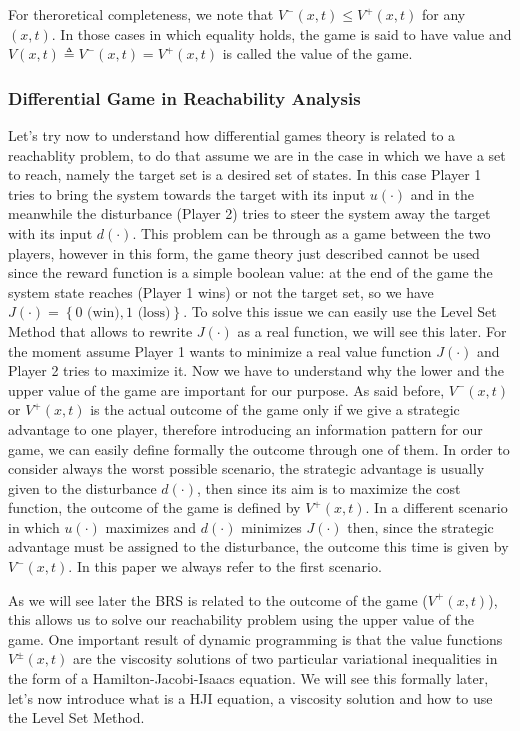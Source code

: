 For theroretical completeness, we note that $V^-(x,t) \leq V^+(x,t)$ for any $(x,t)$. In those cases in which equality holds, the game is said to have value and $V(x,t)\triangleq V^-(x,t) = V^+(x,t)$ is called the value of the game. \cite{new_paper} \newline

\subsubsection{Differential Game in Reachability Analysis}
Let's try now to understand how differential games theory is related to a reachablity problem, to do that assume we are in the case in which we have a set to reach, namely the target set is a desired set of states. In this case Player 1 tries to bring the system towards the target with its input $u(\cdot)$ and in the meanwhile the disturbance (Player 2) tries to steer the system away the target with its input $d(\cdot)$. This problem can be through as a game between the two players, however in this form, the game theory just described cannot be used since the reward function is a simple boolean value: at the end of the game the system state reaches (Player 1 wins) or not the target set, so we have $J(\cdot)=\left\{0 \textrm{ (win)},1\textrm{ (loss)}\right\}$. To solve this issue we can easily use the Level Set Method that allows to rewrite $J(\cdot)$ as a real function, we will see this later. For the moment assume Player 1 wants to minimize a real value function $J(\cdot)$ and Player 2 tries to maximize it. 
Now we have to understand why the lower and the upper value of the game are important for our purpose. As said before, $V^-(x,t)$ or $V^+(x,t)$ is the actual outcome of the game only if we give a strategic advantage to one player, therefore introducing an information pattern for our game, we can easily define formally the outcome through one of them. In order to consider always the worst possible scenario, the strategic advantage is usually given to the disturbance $d(\cdot)$, then since its aim is to maximize the cost function, the outcome of the game is defined by $V^+(x,t)$.
In a different scenario in which $u(\cdot)$ maximizes and $d(\cdot)$ minimizes $J(\cdot)$ then, since the strategic advantage must be assigned to the disturbance, the outcome this time is given by $V^-(x,t)$. In this paper we always refer to the first scenario. 

As we will see later the BRS is related to the outcome of the game ($V^+(x,t)$), this allows us to solve our reachability problem using the upper value of the game. 
One important result of dynamic programming is that the value functions $V^\pm(x,t)$ are the viscosity solutions of two particular variational inequalities in the form of a Hamilton-Jacobi-Isaacs equation. We will see this formally later, let's now introduce what is a HJI equation, a viscosity solution and how to use the Level Set Method.

